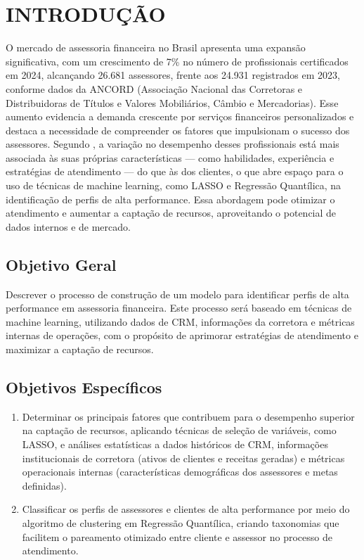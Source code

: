 \chapter{INTRODUÇÃO}

O mercado de assessoria financeira no Brasil apresenta uma expansão
significativa, com um crescimento de 7\% no número de profissionais
certificados em 2024, alcançando 26.681 assessores, frente aos 24.931
registrados em 2023, conforme dados da ANCORD (Associação Nacional das
Corretoras e Distribuidoras de Títulos e Valores Mobiliários, Câmbio e
Mercadorias). Esse aumento evidencia a demanda crescente por serviços
financeiros personalizados e destaca a necessidade de compreender os
fatores que impulsionam o sucesso dos assessores. Segundo \cite{foerster2017}, a variação no desempenho desses profissionais está mais
associada às suas próprias características --- como habilidades,
experiência e estratégias de atendimento --- do que às dos clientes, o
que abre espaço para o uso de técnicas de machine learning, como LASSO e
Regressão Quantílica, na identificação de perfis de alta performance.
Essa abordagem pode otimizar o atendimento e aumentar a captação de
recursos, aproveitando o potencial de dados internos e de mercado.

\section{Objetivo Geral}

Descrever o processo de construção de um modelo para identificar perfis
de alta performance em assessoria financeira. Este processo será baseado
em técnicas de machine learning, utilizando dados de CRM, informações da
corretora e métricas internas de operações, com o propósito de aprimorar
estratégias de atendimento e maximizar a captação de recursos.

\section{Objetivos Específicos}

\begin{enumerate}
  \item Determinar os principais fatores que contribuem para o desempenho
  superior na captação de recursos, aplicando técnicas de seleção de
  variáveis, como LASSO, e análises estatísticas a dados históricos
  de CRM, informações institucionais de corretora (ativos de
  clientes e receitas geradas) e métricas operacionais internas
  (características demográficas dos assessores e metas definidas).

  \item Classificar os perfis de assessores e clientes de alta performance
  por meio do algoritmo de clustering em Regressão Quantílica,
  criando taxonomias que facilitem o pareamento otimizado entre
  cliente e assessor no processo de atendimento.
\end{enumerate}

